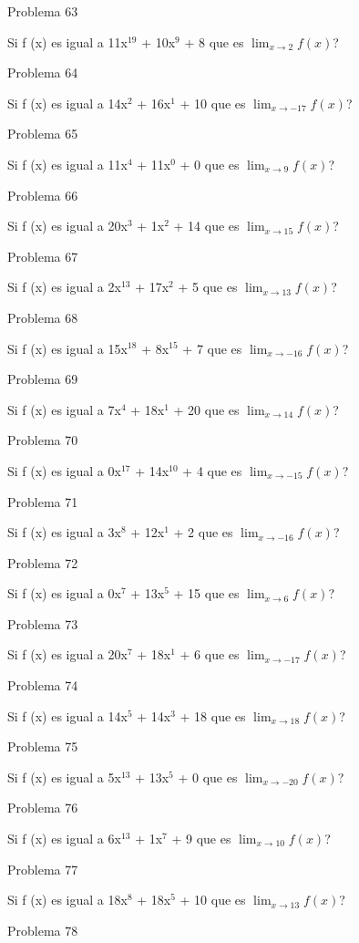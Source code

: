 \documentclass{article}
\begin{document}
Problema 63

Si f (x) es igual a 11x$^{19}$ +  10x${^9}$ + 8 que es $\lim_{x\to 2} f(x) $?

Problema 64

Si f (x) es igual a 14x$^{2}$ +  16x${^1}$ + 10 que es $\lim_{x\to -17} f(x) $?

Problema 65

Si f (x) es igual a 11x$^{4}$ +  11x${^0}$ + 0 que es $\lim_{x\to 9} f(x) $?

Problema 66

Si f (x) es igual a 20x$^{3}$ +  1x${^2}$ + 14 que es $\lim_{x\to 15} f(x) $?

Problema 67

Si f (x) es igual a 2x$^{13}$ +  17x${^2}$ + 5 que es $\lim_{x\to 13} f(x) $?

Problema 68

Si f (x) es igual a 15x$^{18}$ +  8x${^15}$ + 7 que es $\lim_{x\to -16} f(x) $?

Problema 69

Si f (x) es igual a 7x$^{4}$ +  18x${^1}$ + 20 que es $\lim_{x\to 14} f(x) $?

Problema 70

Si f (x) es igual a 0x$^{17}$ +  14x${^10}$ + 4 que es $\lim_{x\to -15} f(x) $?

Problema 71

Si f (x) es igual a 3x$^{8}$ +  12x${^1}$ + 2 que es $\lim_{x\to -16} f(x) $?

Problema 72

Si f (x) es igual a 0x$^{7}$ +  13x${^5}$ + 15 que es $\lim_{x\to 6} f(x) $?

Problema 73

Si f (x) es igual a 20x$^{7}$ +  18x${^1}$ + 6 que es $\lim_{x\to -17} f(x) $?

Problema 74

Si f (x) es igual a 14x$^{5}$ +  14x${^3}$ + 18 que es $\lim_{x\to 18} f(x) $?

Problema 75

Si f (x) es igual a 5x$^{13}$ +  13x${^5}$ + 0 que es $\lim_{x\to -20} f(x) $?

Problema 76

Si f (x) es igual a 6x$^{13}$ +  1x${^7}$ + 9 que es $\lim_{x\to 10} f(x) $?

Problema 77

Si f (x) es igual a 18x$^{8}$ +  18x${^5}$ + 10 que es $\lim_{x\to 13} f(x) $?

Problema 78
\end{document}
